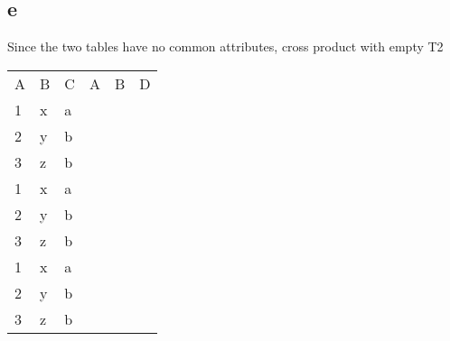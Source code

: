 \documentclass[twoside]{Homework}
\begin{document}
\newpage
\subsection*{e}
Since the two tables have no common attributes, cross product with empty T2
\begin{table}[h]
    \begin{tabular}{llllll}
    A & B & C & A & B & D \\
    1 & x & a &  &  &  \\
    2 & y & b &  &  &  \\
    3 & z & b &  &  &  \\
    1 & x & a &  &  &  \\
    2 & y & b &  &  &  \\
    3 & z & b &  &  &  \\
    1 & x & a &  &  &  \\
    2 & y & b &  &  &  \\
    3 & z & b &  &  &  \\
    \end{tabular}
\end{table}
\end{document}
